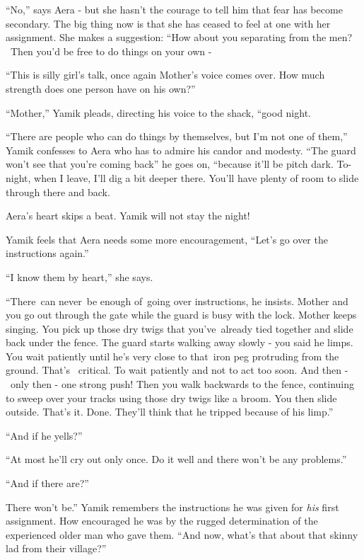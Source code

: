 \documentclass[letterpaper]{article}
\begin{document}
{}``No,'' says Aera -{ }but she hasn't the courage to tell him that fear has
become secondary. The big thing now is that she has ceased to feel at one with her assignment. She makes a suggestion:
``How about you separating from the men? \ Then you'd be free to do things on your own -{\textquotedbl} 

{}``This is silly girl's talk,{\textquotedbl} once again Mother's voice comes over. {\textquotedbl}How much strength
does one person have on his own?'' 

{}``Mother,'' Yamik pleads, directing his voice to the shack, ``good night.{\textquotedbl} 

{}``There are people who can do things by themselves, but I'm not one of them,''
Yamik{ }confesses to Aera who has to admire his candor and modesty. ``The guard
won't see that you're coming back'' he goes on, ``because it'll be pitch dark. To-night, when I leave, I'll dig a bit
deeper there. You'll have plenty of room to slide through there and back.{\textquotedbl} 

Aera's heart skips a beat. Yamik will not stay the night! 

Yamik feels that Aera needs some more encouragement, ``Let's go over the instructions again.'' 

{}``I know them by heart,'' she says. 

{}``There~can never~be enough of~going over instructions,{\textquotedbl} he insists. {\textquotedbl}Mother and you go
out through the gate while the guard is busy with the lock. Mother keeps singing. You pick up those dry twigs that
you've~already tied together and slide back under the fence. The guard starts walking away slowly
{{}- }you said he limps. You wait patiently until he's very close to that~iron
peg protruding from the ground. That's \ critical. To wait patiently and not to act too soon. And then - \ only then -
one strong push! Then you walk backwards to the fence, continuing to sweep over your tracks using those dry
twigs{ }like a broom. You then slide outside. That's it. Done. They'll think
that he tripped{ }because of his limp.'' 

{}``And if he yells?'' 

{}``At most he'll cry out only once. Do it well and there won't be any problems.'' 

{}``And if there are?'' 

{\textquotedbl}There won't be.'' Yamik remembers the instructions he was given for \textit{his} first assignment. How
encouraged he was by the rugged determination of the experienced older man who gave them. ``And now, what's that about
that skinny lad from their village?'' 
\end{document}
